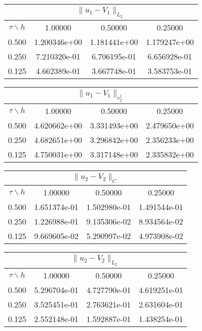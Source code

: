 \begin{center}
\begin{tabular}{||c|c|c|c||}
\hline
\hline
\multicolumn{4}{||c||}{$\|u_1-V_1\| _{L_2}$}\\ 
\hline
\hline
$\tau \backslash h$ & 1.00000 & 0.50000 & 0.25000\\ 
\hline 
0.500& 1.200346e+00 &1.181441e+00 &1.179247e+00 \\ 
\hline
0.250& 7.210320e-01 &6.706195e-01 &6.656928e-01 \\ 
\hline
0.125& 4.662389e-01 &3.667748e-01 &3.583753e-01 \\ 
\hline
\hline
\end{tabular}
\end{center}
\begin{center}
\begin{tabular}{||c|c|c|c||}
\hline
\hline
\multicolumn{4}{||c||}{$\|u_1-V_1\| _{v_2^1}$}\\ 
\hline
\hline
$\tau \backslash h$ & 1.00000 & 0.50000 & 0.25000\\ 
\hline 
0.500& 4.620662e+00 &3.331493e+00 &2.479650e+00 \\ 
\hline
0.250& 4.682651e+00 &3.296842e+00 &2.356233e+00 \\ 
\hline
0.125& 4.750031e+00 &3.317148e+00 &2.335832e+00 \\ 
\hline
\hline
\end{tabular}
\end{center}
\begin{center}
\begin{tabular}{||c|c|c|c||}
\hline
\hline
\multicolumn{4}{||c||}{$\|u_2-V_2\| _{C}$}\\ 
\hline
\hline
$\tau \backslash h$ & 1.00000 & 0.50000 & 0.25000\\ 
\hline 
0.500& 1.651374e-01 &1.502980e-01 &1.491544e-01 \\ 
\hline
0.250& 1.226988e-01 &9.135306e-02 &8.934564e-02 \\ 
\hline
0.125& 9.669605e-02 &5.290997e-02 &4.973908e-02 \\ 
\hline
\hline
\end{tabular}
\end{center}
\begin{center}
\begin{tabular}{||c|c|c|c||}
\hline
\hline
\multicolumn{4}{||c||}{$\|u_2-V_2\| _{L_2}$}\\ 
\hline
\hline
$\tau \backslash h$ & 1.00000 & 0.50000 & 0.25000\\ 
\hline 
0.500& 5.296704e-01 &4.727790e-01 &4.619251e-01 \\ 
\hline
0.250& 3.525451e-01 &2.763621e-01 &2.631604e-01 \\ 
\hline
0.125& 2.552148e-01 &1.592887e-01 &1.438254e-01 \\ 
\hline
\hline
\end{tabular}
\end{center}
